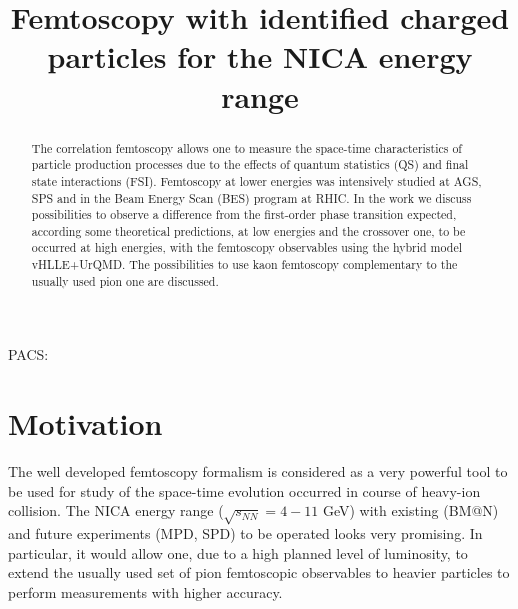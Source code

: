 \documentclass[a4paper]{panl}
\begin{document}

\title{Femtoscopy with identified charged particles for the NICA energy range}
\maketitle
{}
\vspace{-3mm}
\vspace{-3mm}
\vspace{-3mm}


\begin{abstract}
  The correlation femtoscopy allows one to measure the space-time characteristics of particle production processes
  due to the effects of quantum statistics (QS) and final state interactions (FSI).
  Femtoscopy at lower energies was intensively studied at AGS, SPS and in the Beam Energy Scan (BES) program at RHIC.
  In the work we discuss possibilities to observe a difference from the first-order phase transition expected, according 
  some theoretical predictions, at low energies and the crossover one, to be occurred at high energies, with the femtoscopy 
  observables using the hybrid model vHLLE+UrQMD.
  The possibilities to use kaon femtoscopy complementary to the usually used pion one are discussed.
\end{abstract}
\vspace*{6pt}

\noindent
PACS:

\vspace{-6mm}
\label{sec:intro}
\section*{Motivation}

The well developed femtoscopy formalism is considered as a very powerful tool to be used for study of the space-time evolution 
occurred in course of heavy-ion collision. The NICA energy range ($\sqrt{s_{NN}} = 4 - 11$ GeV) with existing (BM@N) and future 
experiments (MPD, SPD) to be operated looks very promising.
In particular, it would allow one, due to a high planned level of luminosity, to extend the usually used set of pion femtoscopic 
observables to heavier particles to perform measurements with higher accuracy.     
\end{document}
